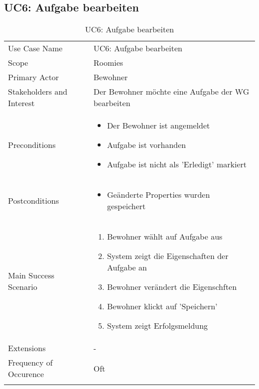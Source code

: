 \subsection{UC6: Aufgabe bearbeiten}
\begin{table}[H]
	\tablestyle
	\tablealtcolored
	\begin{tabularx}{\textwidth}{lX}
		\tablebody
			Use Case Name &
			UC6: Aufgabe bearbeiten
			\tabularnewline
			Scope &
			Roomies
			\tabularnewline
			Primary Actor &
			Bewohner
			\tabularnewline
			Stakeholders and Interest &
			Der Bewohner möchte eine Aufgabe der WG bearbeiten
			\tabularnewline
			Preconditions &
			\begin{itemize}
				\item Der Bewohner ist angemeldet
				\item Aufgabe ist vorhanden
				\item Aufgabe ist nicht als 'Erledigt' markiert
			\end{itemize}
			\tabularnewline
			Postconditions &
			\begin{itemize}
				\item Geänderte Properties wurden gespeichert
			\end{itemize}
			\tabularnewline
			Main Success Scenario &
			\begin{enumerate}
				\item Bewohner wählt auf Aufgabe aus
				\item System zeigt die Eigenschaften der Aufgabe an
				\item Bewohner verändert die Eigenschften
				\item Bewohner klickt auf 'Speichern'
				\item System zeigt Erfolgsmeldung
			\end{enumerate}
			\tabularnewline
			Extensions &
			-
			\tabularnewline
			Frequency of Occurence &
			Oft
			\tabularnewline
		\tableend
	\end{tabularx}
	\caption{UC6: Aufgabe bearbeiten}
\end{table}


